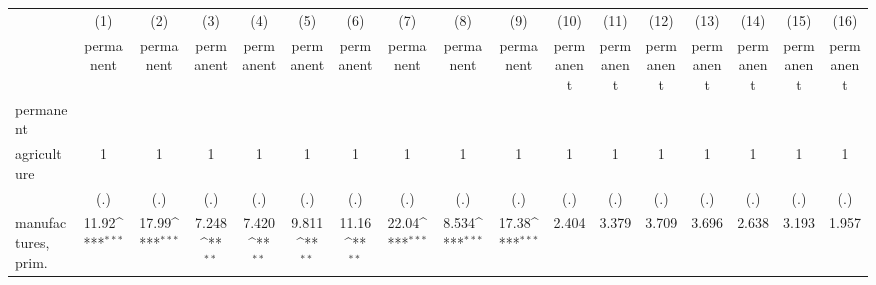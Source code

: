{
\def\sym#1{\ifmmode^{#1}\else\(^{#1}\)\fi}
\begin{tabular}{l*{16}{c}}
\hline\hline
                    &\multicolumn{1}{c}{(1)}&\multicolumn{1}{c}{(2)}&\multicolumn{1}{c}{(3)}&\multicolumn{1}{c}{(4)}&\multicolumn{1}{c}{(5)}&\multicolumn{1}{c}{(6)}&\multicolumn{1}{c}{(7)}&\multicolumn{1}{c}{(8)}&\multicolumn{1}{c}{(9)}&\multicolumn{1}{c}{(10)}&\multicolumn{1}{c}{(11)}&\multicolumn{1}{c}{(12)}&\multicolumn{1}{c}{(13)}&\multicolumn{1}{c}{(14)}&\multicolumn{1}{c}{(15)}&\multicolumn{1}{c}{(16)}\\
                    &\multicolumn{1}{c}{permanent}&\multicolumn{1}{c}{permanent}&\multicolumn{1}{c}{permanent}&\multicolumn{1}{c}{permanent}&\multicolumn{1}{c}{permanent}&\multicolumn{1}{c}{permanent}&\multicolumn{1}{c}{permanent}&\multicolumn{1}{c}{permanent}&\multicolumn{1}{c}{permanent}&\multicolumn{1}{c}{permanent}&\multicolumn{1}{c}{permanent}&\multicolumn{1}{c}{permanent}&\multicolumn{1}{c}{permanent}&\multicolumn{1}{c}{permanent}&\multicolumn{1}{c}{permanent}&\multicolumn{1}{c}{permanent}\\
\hline
permanent           &                     &                     &                     &                     &                     &                     &                     &                     &                     &                     &                     &                     &                     &                     &                     &                     \\
agriculture         &           1         &           1         &           1         &           1         &           1         &           1         &           1         &           1         &           1         &           1         &           1         &           1         &           1         &           1         &           1         &           1         \\
                    &         (.)         &         (.)         &         (.)         &         (.)         &         (.)         &         (.)         &         (.)         &         (.)         &         (.)         &         (.)         &         (.)         &         (.)         &         (.)         &         (.)         &         (.)         &         (.)         \\
[1em]
manufactures, prim. &       11.92\sym{***}&       17.99\sym{***}&       7.248\sym{**} &       7.420\sym{**} &       9.811\sym{**} &       11.16\sym{**} &       22.04\sym{***}&       8.534\sym{***}&       17.38\sym{***}&       2.404         &       3.379         &       3.709         &       3.696         &       2.638         &       3.193         &       1.957         \\

\end{tabular}}
